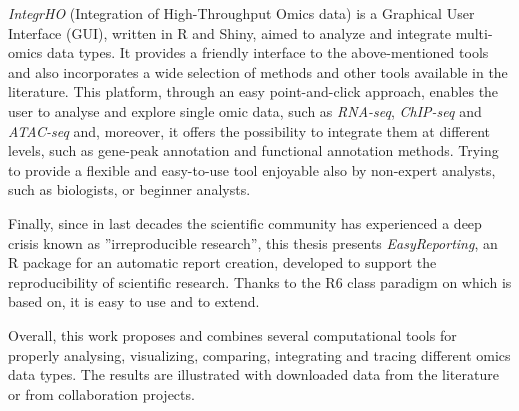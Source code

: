 \textit{IntegrHO} (Integration of High-Throughput Omics data) is a Graphical User Interface (GUI), written in R and Shiny, aimed to analyze and integrate multi-omics data types. 
It provides a friendly interface to the above-mentioned tools and also incorporates a wide selection of methods and other tools available in the literature. This platform, through an easy point-and-click approach, enables the user to analyse and explore single omic data, such as \textit{RNA-seq}, \textit{ChIP-seq} and \textit{ATAC-seq} and, moreover, it offers the possibility to integrate them at different levels, such as gene-peak annotation and functional annotation methods.
Trying to provide a flexible and easy-to-use tool enjoyable also by non-expert analysts, such as biologists, or beginner analysts.

Finally, since in last decades the scientific community has experienced a deep crisis known as ''irreproducible research'', this thesis presents \textit{EasyReporting}, an R package for an automatic report creation, developed to support the reproducibility of scientific research.  
Thanks to the R6 class paradigm on which is based on, it is easy to use and to extend.

Overall, this work proposes and combines several computational tools for properly analysing, visualizing, comparing, integrating and tracing different omics data types.
The results are illustrated with downloaded data from the literature or from collaboration projects.